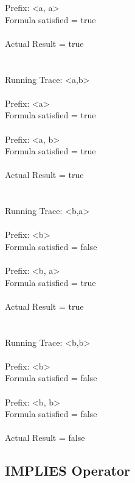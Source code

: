 \noindent  Prefix: \textless a, a\textgreater\\
  Formula satisfied = true\\
\\
  Actual Result = true\\
\\
\\
Running Trace: \textless a,b\textgreater\\
\\
  Prefix: \textless a\textgreater\\
  Formula satisfied = true\\
\\
  Prefix: \textless a, b\textgreater\\
  Formula satisfied = true\\
\\
  Actual Result = true\\
\\
\\
Running Trace: \textless b,a\textgreater\\
\\
  Prefix: \textless b\textgreater\\
  Formula satisfied = false\\
\\
  Prefix: \textless b, a\textgreater\\
  Formula satisfied = true\\
\\
  Actual Result = true\\
\\
\\
Running Trace: \textless b,b\textgreater\\
\\
  Prefix: \textless b\textgreater\\
  Formula satisfied = false\\
\\
  Prefix: \textless b, b\textgreater\\
  Formula satisfied = false\\
\\
  Actual Result = false\\

\newpage

\subsection{IMPLIES Operator}

